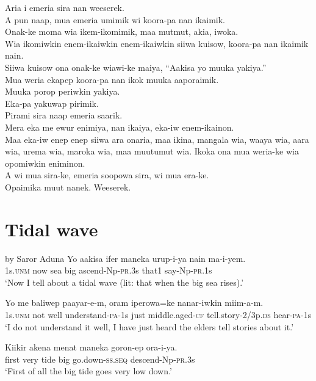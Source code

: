 Aria i emeria sira nan weeserek. \\
A pun naap, mua emeria umimik wi koora-pa nan ikaimik. \\
Onak-ke moma wia ikem-ikomimik, maa mutmut, akia, iwoka. \\
Wia ikomiwkin enem-ikaiwkin enem-ikaiwkin siiwa kuisow, koora-pa nan ikaimik nain. \\
Siiwa kuisow ona onak-ke wiawi-ke maiya, “Aakisa yo muuka yakiya.” \\
Mua weria ekapep koora-pa nan ikok muuka aaporaimik. \\
Muuka porop periwkin yakiya. \\
Eka-pa yakuwap pirimik. \\
Pirami sira naap emeria saarik. \\
Mera eka me ewur enimiya, nan ikaiya, eka-iw enem-ikainon. \\
\textrm{Maa eka-iw enep enep siiwa ara onaria, maa ikina, mangala wia, waaya wia, aara wia, urema wia, maroka wia, maa muutumut wia.}
Ikoka ona mua weria-ke wia opomiwkin eniminon. \\
A wi mua sira-ke, emeria soopowa sira, wi mua era-ke. \\
\textrm{Opaimika muut nanek. }
Weeserek. \\
\setcounter{equation}{0}
\section{ Tidal wave}
 by Saror Aduna
\ea
\gll  Yo  aakisa  ifer  maneka  urup-i-ya  nain  ma-i-yem. \\
1s.\textsc{unm}  now  sea  big  ascend-Np-\textsc{pr}.3s  that1  say-Np-\textsc{pr}.1s \\
\glt ‘Now I tell about a tidal wave (lit: that when the big sea rises).’ \\
\z


\ea
\gll  Yo  me  baliwep  paayar-e-m,  oram  iperowa=ke      nanar-iwkin  miim-a-m. \\
1s.\textsc{unm}  not  well  understand-\textsc{pa}-1s  just  middle.aged-\textsc{cf} tell.story-2/3p.\textsc{ds}  hear-\textsc{pa}-1s \\


\glt ‘I do not understand it well, I have just heard the elders tell stories about it.’ \\
\z


\ea
\gll  Kiikir  akena  menat  maneka  goron-ep  ora-i-ya. \\
first  very  tide  big  go.down-\textsc{ss.seq}  descend-Np-\textsc{pr}.3s \\
\glt ‘First of all the big tide goes very low down.’ \\
\z



